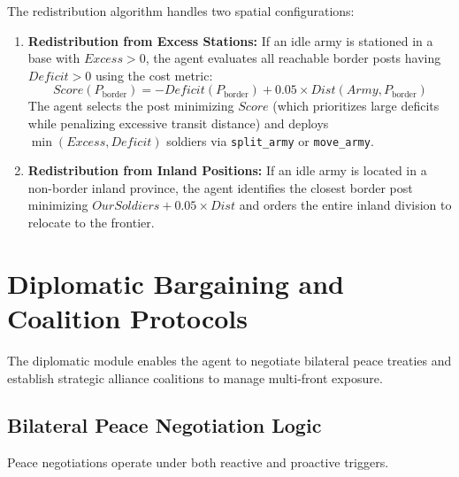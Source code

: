 The redistribution algorithm handles two spatial configurations:
\begin{enumerate}[label=\alph*)]
    \item \textbf{Redistribution from Excess Stations:} If an idle army is stationed in a base with $\mathit{Excess} > 0$, the agent evaluates all reachable border posts having $\mathit{Deficit} > 0$ using the cost metric:
    \begin{equation}
        \label{eq:deficit_score}
        \mathit{Score}(P_{\text{border}}) = -\mathit{Deficit}(P_{\text{border}}) + 0.05 \times \mathit{Dist}(\mathit{Army}, P_{\text{border}})
    \end{equation}
    The agent selects the post minimizing $\mathit{Score}$ (which prioritizes large deficits while penalizing excessive transit distance) and deploys $\min(\mathit{Excess}, \mathit{Deficit})$ soldiers via \texttt{split\_army} or \texttt{move\_army}.
    \item \textbf{Redistribution from Inland Positions:} If an idle army is located in a non-border inland province, the agent identifies the closest border post minimizing $\mathit{OurSoldiers} + 0.05 \times \mathit{Dist}$ and orders the entire inland division to relocate to the frontier.
\end{enumerate}

\section{Diplomatic Bargaining and Coalition Protocols}
\label{sec:impl_diplomacy}

The diplomatic module enables the agent to negotiate bilateral peace treaties and establish strategic alliance coalitions to manage multi-front exposure.

\subsection{Bilateral Peace Negotiation Logic}
\label{subsec:peace_negotiation}

Peace negotiations operate under both reactive and proactive triggers.

